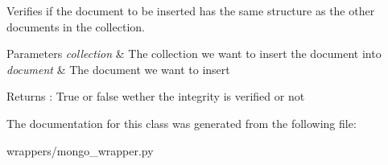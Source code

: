 Verifies if the document to be inserted has the same structure as the other documents in the collection. 


\begin{DoxyParams}{Parameters}
{\em collection} & The collection we want to insert the document into \\
\hline
{\em document} & The document we want to insert \\
\hline
\end{DoxyParams}
\begin{DoxyReturn}{Returns}
\+: True or false wether the integrity is verified or not 
\end{DoxyReturn}


The documentation for this class was generated from the following file\+:\begin{DoxyCompactItemize}
\item 
wrappers/mongo\+\_\+wrapper.\+py\end{DoxyCompactItemize}

